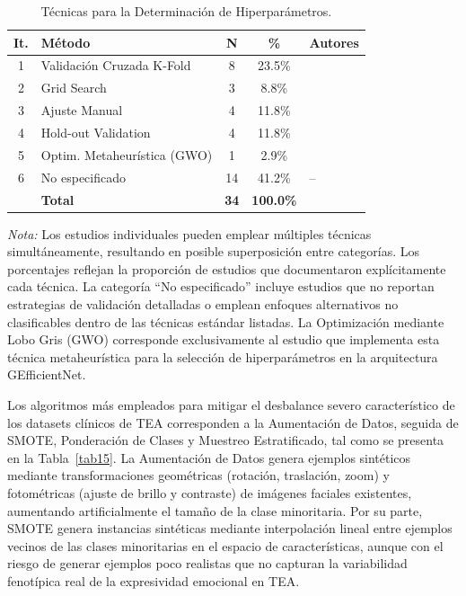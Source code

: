 \documentclass[3p,twocolumn,times]{elsarticle}
\begin{document}
	\begin{table}[!ht]
		\centering
		\caption{Técnicas para la Determinación de Hiperparámetros.}\label{tab14}
		\begin{tabular}{cp{3cm}ccp{4cm}}
			\toprule
			\textbf{It.} & \textbf{Método} & \textbf{N} & \textbf{\%} & \textbf{Autores} \\
			\midrule
			1 & Validación Cruzada K-Fold         & 8  & 23.5\% &
			\cite{Shaik2025,Ahmad2024,Radocaj2025,Washington2022,Hassan2025,Alam2025,Rhatassi2025,Ramachandran2025} \\
			2 & Grid Search                       & 3  & 8.8\%  & \cite{Radocaj2025,Ramachandran2025,AkinBulbul2024} \\
			3 & Ajuste Manual                     & 4  & 11.8\% & \cite{Johnson2025,Sholikah2024,Aljbori2025,Hosney2024} \\
			4 & Hold-out Validation               & 4  & 11.8\% & \cite{Shaik2025,Sariyanidi2025,Hwang2024,Cicceri2026} \\
			5 & Optim. Metaheurística (GWO) & 1  & 2.9\%  & \cite{Ramachandran2025} \\
			6 & No especificado                   & 14 & 41.2\% & -- \\
			& \textbf{Total}                    & \textbf{34} & \textbf{100.0\%} & \\
			\bottomrule
		\end{tabular}
		\begin{minipage}{\textwidth}
			\vspace{6pt}
			\small\textit{Nota:} Los estudios individuales pueden emplear múltiples técnicas
			simultáneamente, resultando en posible superposición entre categorías. Los
			porcentajes reflejan la proporción de estudios que documentaron explícitamente
			cada técnica. La categoría ``No especificado'' incluye estudios que no reportan
			estrategias de validación detalladas o emplean enfoques alternativos no
			clasificables dentro de las técnicas estándar listadas. La Optimización mediante
			Lobo Gris (GWO) corresponde exclusivamente al estudio \cite{Ramachandran2025} que
			implementa esta técnica metaheurística para la selección de hiperparámetros en la
			arquitectura GEfficientNet.
		\end{minipage}
	\end{table}
	
	Los algoritmos más empleados para mitigar el desbalance severo característico de
	los datasets clínicos de TEA corresponden a la Aumentación de Datos, seguida de
	SMOTE, Ponderación de Clases y Muestreo Estratificado, tal como se presenta en la
	Tabla~\ref{tab15}. La Aumentación de Datos genera ejemplos sintéticos mediante
	transformaciones geométricas (rotación, traslación, zoom) y fotométricas (ajuste
	de brillo y contraste) de imágenes faciales existentes, aumentando artificialmente
	el tamaño de la clase minoritaria. Por su parte, SMOTE genera instancias sintéticas
	mediante interpolación lineal entre ejemplos vecinos de las clases minoritarias en
	el espacio de características, aunque con el riesgo de generar ejemplos poco
	realistas que no capturan la variabilidad fenotípica real de la expresividad
	emocional en TEA.
	
\end{document}
